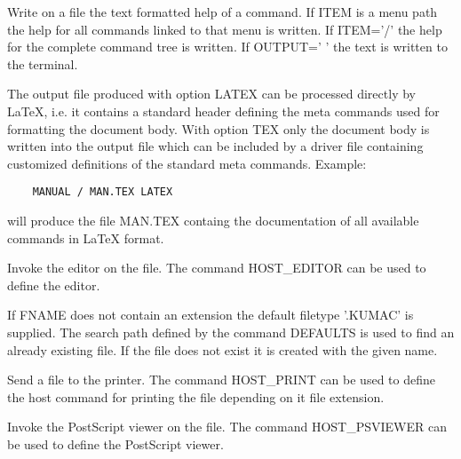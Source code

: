   \par
Write on a file the text formatted help of a command.  If ITEM is a menu 
   path the help for all commands linked to that menu is written.  If ITEM='/' 
   the help for the complete command tree is written.  If OUTPUT=' ' the text 
   is written to the terminal.  

   \par
The output file produced with option LATEX can be processed directly by 
   LaTeX, i.e. it contains a standard header defining the meta commands used 
   for formatting the document body.  With option TEX only the document body 
   is written into the output file which can be included by a driver file 
   containing customized definitions of the standard meta commands.  Example:  
\begin{verbatim}
    MANUAL / MAN.TEX LATEX
\end{verbatim}
   \par
will produce the file MAN.TEX containg the documentation of all available 
   commands in LaTeX format.  

\ENDCMD


\BEGARG
{}
\ENDARG

   \par
Invoke the editor on the file.  The command HOST_EDITOR can be used to 
   define the editor.  

   \par
If FNAME does not contain an extension the default filetype '.KUMAC' is 
   supplied.  The search path defined by the command DEFAULTS is used to find 
   an already existing file.  If the file does not exist it is created with 
   the given name.  

\ENDCMD


\BEGARG
{}
\ENDARG

   \par
Send a file to the printer.  The command HOST_PRINT can be used to define 
   the host command for printing the file depending on it file extension.  

\ENDCMD


\BEGARG
{}
\ENDARG

   \par
Invoke the PostScript viewer on the file.  The command HOST_PSVIEWER can 
   be used to define the PostScript viewer.  

